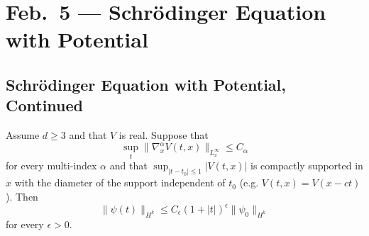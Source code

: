 \chapter{Feb.~5 --- Schr\"odinger Equation with Potential}

\section{Schr\"odinger Equation with Potential, Continued}

\begin{theorem}[Bourgain]
  Assume $d \ge 3$ and that $V$ is real. Suppose that
  \[
    \sup_{t} \| \nabla_x^\alpha V(t, x) \|_{L^\infty_x} \le C_\alpha
  \]
  for every multi-index $\alpha$ and that
  $\sup_{|t - t_0| \le 1} |V(t, x)|$ is compactly
  supported in $x$ with the diameter of the support
  independent of $t_0$ (e.g. $V(t, x) = V(x - ct)$).
  Then
  \[
    \|\psi(t)\|_{H^k} \le C_\epsilon (1 + |t|)^{\epsilon} \|\psi_0\|_{H^k}
  \]
  for every $\epsilon > 0$.
\end{theorem}

